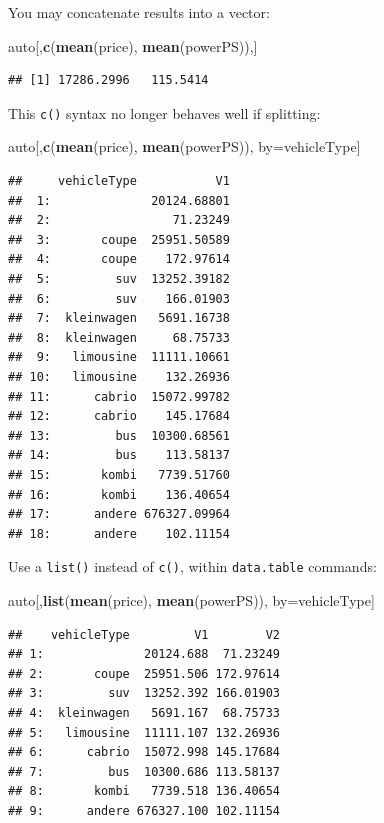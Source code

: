 \documentclass[]{book}
\newenvironment{Shaded}{\begin{snugshade}}{\end{snugshade}}
\newcommand{\KeywordTok}[1]{\textcolor[rgb]{0.13,0.29,0.53}{\textbf{#1}}}
\newcommand{\NormalTok}[1]{#1}
\theoremstyle{definition}
\theoremstyle{definition}
\theoremstyle{definition}
\theoremstyle{remark}
\begin{document}
You may concatenate results into a vector:

\begin{Shaded}
\begin{Highlighting}[]
\NormalTok{auto[,}\KeywordTok{c}\NormalTok{(}\KeywordTok{mean}\NormalTok{(price), }\KeywordTok{mean}\NormalTok{(powerPS)),]}
\end{Highlighting}
\end{Shaded}

\begin{verbatim}
## [1] 17286.2996   115.5414
\end{verbatim}

This \texttt{c()} syntax no longer behaves well if splitting:

\begin{Shaded}
\begin{Highlighting}[]
\NormalTok{auto[,}\KeywordTok{c}\NormalTok{(}\KeywordTok{mean}\NormalTok{(price), }\KeywordTok{mean}\NormalTok{(powerPS)), by=vehicleType]}
\end{Highlighting}
\end{Shaded}

\begin{verbatim}
##     vehicleType           V1
##  1:              20124.68801
##  2:                 71.23249
##  3:       coupe  25951.50589
##  4:       coupe    172.97614
##  5:         suv  13252.39182
##  6:         suv    166.01903
##  7:  kleinwagen   5691.16738
##  8:  kleinwagen     68.75733
##  9:   limousine  11111.10661
## 10:   limousine    132.26936
## 11:      cabrio  15072.99782
## 12:      cabrio    145.17684
## 13:         bus  10300.68561
## 14:         bus    113.58137
## 15:       kombi   7739.51760
## 16:       kombi    136.40654
## 17:      andere 676327.09964
## 18:      andere    102.11154
\end{verbatim}

Use a \texttt{list()} instead of \texttt{c()}, within \texttt{data.table} commands:

\begin{Shaded}
\begin{Highlighting}[]
\NormalTok{auto[,}\KeywordTok{list}\NormalTok{(}\KeywordTok{mean}\NormalTok{(price), }\KeywordTok{mean}\NormalTok{(powerPS)), by=vehicleType]}
\end{Highlighting}
\end{Shaded}

\begin{verbatim}
##    vehicleType         V1        V2
## 1:              20124.688  71.23249
## 2:       coupe  25951.506 172.97614
## 3:         suv  13252.392 166.01903
## 4:  kleinwagen   5691.167  68.75733
## 5:   limousine  11111.107 132.26936
## 6:      cabrio  15072.998 145.17684
## 7:         bus  10300.686 113.58137
## 8:       kombi   7739.518 136.40654
## 9:      andere 676327.100 102.11154
\end{verbatim}
\end{document}
